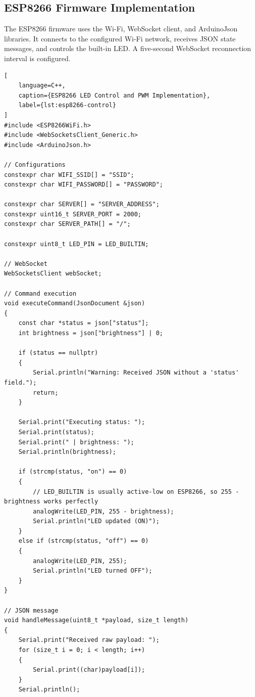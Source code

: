 \documentclass[12pt,a4paper]{article}
\begin{document}
\vspace{0.5cm}

\subsection*{ESP8266 Firmware Implementation}

The ESP8266 firmware uses the Wi-Fi, WebSocket client,
and ArduinoJson libraries. It connects to the configured
Wi-Fi network, receives JSON state messages, and controls
the built-in LED. A five-second WebSocket reconnection
interval is configured.

\vspace{1cm}

\begin{lstlisting}[
    language=C++,
    caption={ESP8266 LED Control and PWM Implementation},
    label={lst:esp8266-control}
]
#include <ESP8266WiFi.h>
#include <WebSocketsClient_Generic.h>
#include <ArduinoJson.h>

// Configurations
constexpr char WIFI_SSID[] = "SSID";
constexpr char WIFI_PASSWORD[] = "PASSWORD";

constexpr char SERVER[] = "SERVER_ADDRESS";
constexpr uint16_t SERVER_PORT = 2000;
constexpr char SERVER_PATH[] = "/";

constexpr uint8_t LED_PIN = LED_BUILTIN;

// WebSocket
WebSocketsClient webSocket;

// Command execution
void executeCommand(JsonDocument &json)
{
    const char *status = json["status"];
    int brightness = json["brightness"] | 0;

    if (status == nullptr)
    {
        Serial.println("Warning: Received JSON without a 'status' field.");
        return;
    }

    Serial.print("Executing status: ");
    Serial.print(status);
    Serial.print(" | brightness: ");
    Serial.println(brightness);

    if (strcmp(status, "on") == 0)
    {
        // LED_BUILTIN is usually active-low on ESP8266, so 255 - brightness works perfectly
        analogWrite(LED_PIN, 255 - brightness);
        Serial.println("LED updated (ON)");
    }
    else if (strcmp(status, "off") == 0)
    {
        analogWrite(LED_PIN, 255);
        Serial.println("LED turned OFF");
    }
}

// JSON message
void handleMessage(uint8_t *payload, size_t length)
{
    Serial.print("Received raw payload: ");
    for (size_t i = 0; i < length; i++)
    {
        Serial.print((char)payload[i]);
    }
    Serial.println();


\end{lstlisting}
\end{document}
